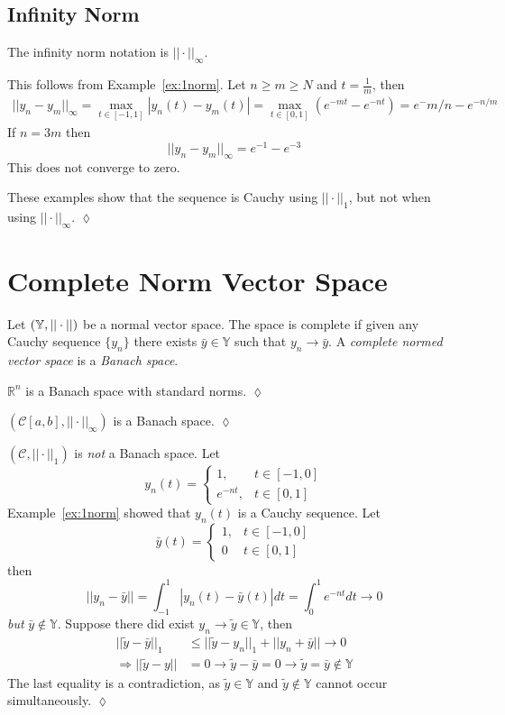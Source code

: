 \subsection{Infinity Norm}
The infinity norm notation is $||\cdot||_\infty$.
\begin{example}
This follows from Example~\ref{ex:1norm}.
Let $n\geq m\geq N$ and $t=\frac{1}{m}$, then
\begin{align*}
||y_n-y_m||_\infty = \max_{t\in[-1,1]}|y_n(t)-y_m(t)| = \max_{t\in[0,1]}(e^{-mt}-e^{-nt}) = e^-{m/n}-e^{-n/m}
\end{align*}
If $n=3m$ then
$$||y_n-y_m||_\infty = e^{-1}-e^{-3}$$
This does not converge to zero.

These examples show that the sequence is Cauchy using $||\cdot||_1$, but not when using $||\cdot||_\infty$.
$\lozenge$
\end{example}

\section{Complete Norm Vector Space}
\begin{definition}
Let $(\mathbb{Y},||\cdot||)$ be a normal vector space.
The space is complete if given any Cauchy sequence $\{y_n\}$ there exists $\bar{y}\in\mathbb{Y}$ such that $y_n\to\bar{y}$.
A \textit{complete normed vector space} is a \textit{Banach space}.
\end{definition}

\begin{example}
$\mathbb{R}^n$ is a Banach space with standard norms.
$\lozenge$
\end{example}

\begin{example}
$(\mathcal{C}[a,b],||\cdot||_\infty)$ is a Banach space.
$\lozenge$
\end{example}

\begin{example}
$(\mathcal{C},||\cdot||_1)$ is \textit{not} a Banach space.
Let
$$y_n(t) = \begin{cases} 1, & t\in[-1,0] \\ e^{-nt}, & t\in[0,1] \end{cases}$$
Example~\ref{ex:1norm} showed that $y_n(t)$ is a Cauchy sequence.
Let
$$\bar{y}(t) = \begin{cases} 1, & t\in[-1,0] \\ 0 & t\in[0,1] \end{cases}$$
then
$$||y_n-\bar{y}|| = \int_{-1}^1|y_n(t)-\bar{y}(t)|dt = \int_0^1e^{-nt}dt\to 0$$
\textit{but} $\bar{y}\notin\mathbb{Y}$.
Suppose there did exist $y_n\to\tilde{y}\in\mathbb{Y}$, then
\begin{align*}
||\tilde{y}-\bar{y}||_1 &\leq ||\tilde{y}-y_n||_1+||y_n+\bar{y}||\to 0 \\
\Rightarrow ||\tilde{y}-y|| &= 0 \to \tilde{y}-\bar{y}=0 \to \tilde{y}=\bar{y}\notin\mathbb{Y}
\end{align*}
The last equality is a contradiction, as $\tilde{y}\in\mathbb{Y}$ and $\tilde{y}\notin\mathbb{Y}$ cannot occur simultaneously.
$\lozenge$
\end{example}

